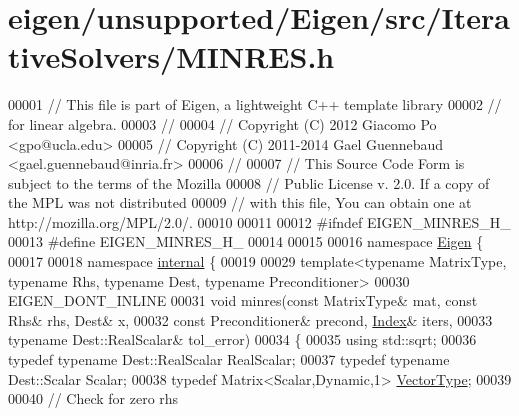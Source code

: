 \hypertarget{eigen_2unsupported_2_eigen_2src_2_iterative_solvers_2_m_i_n_r_e_s_8h_source}{}\section{eigen/unsupported/\+Eigen/src/\+Iterative\+Solvers/\+M\+I\+N\+R\+ES.h}
\label{eigen_2unsupported_2_eigen_2src_2_iterative_solvers_2_m_i_n_r_e_s_8h_source}

\begin{DoxyCode}
00001 \textcolor{comment}{// This file is part of Eigen, a lightweight C++ template library}
00002 \textcolor{comment}{// for linear algebra.}
00003 \textcolor{comment}{//}
00004 \textcolor{comment}{// Copyright (C) 2012 Giacomo Po <gpo@ucla.edu>}
00005 \textcolor{comment}{// Copyright (C) 2011-2014 Gael Guennebaud <gael.guennebaud@inria.fr>}
00006 \textcolor{comment}{//}
00007 \textcolor{comment}{// This Source Code Form is subject to the terms of the Mozilla}
00008 \textcolor{comment}{// Public License v. 2.0. If a copy of the MPL was not distributed}
00009 \textcolor{comment}{// with this file, You can obtain one at http://mozilla.org/MPL/2.0/.}
00010 
00011 
00012 \textcolor{preprocessor}{#ifndef EIGEN\_MINRES\_H\_}
00013 \textcolor{preprocessor}{#define EIGEN\_MINRES\_H\_}
00014 
00015 
00016 \textcolor{keyword}{namespace }\hyperlink{namespace_eigen}{Eigen} \{
00017     
00018     \textcolor{keyword}{namespace }\hyperlink{namespaceinternal}{internal} \{
00019         
00029         \textcolor{keyword}{template}<\textcolor{keyword}{typename} MatrixType, \textcolor{keyword}{typename} Rhs, \textcolor{keyword}{typename} Dest, \textcolor{keyword}{typename} Preconditioner>
00030         EIGEN\_DONT\_INLINE
00031         \textcolor{keywordtype}{void} minres(\textcolor{keyword}{const} MatrixType& mat, \textcolor{keyword}{const} Rhs& rhs, Dest& x,
00032                     \textcolor{keyword}{const} Preconditioner& precond, \hyperlink{namespace_eigen_a62e77e0933482dafde8fe197d9a2cfde}{Index}& iters,
00033                     \textcolor{keyword}{typename} Dest::RealScalar& tol\_error)
00034         \{
00035             \textcolor{keyword}{using} std::sqrt;
00036             \textcolor{keyword}{typedef} \textcolor{keyword}{typename} Dest::RealScalar RealScalar;
00037             \textcolor{keyword}{typedef} \textcolor{keyword}{typename} Dest::Scalar Scalar;
00038             \textcolor{keyword}{typedef} Matrix<Scalar,Dynamic,1> \hyperlink{struct_vector_type}{VectorType};
00039 
00040             \textcolor{comment}{// Check for zero rhs}

\end{DoxyCode}
